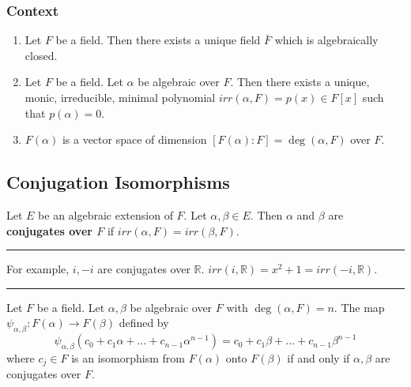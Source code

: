 \subsubsection*{Context}
\begin{enumerate}
	\item Let $F$ be a field.
		Then there exists a unique field $\bar{F}$ which is algebraically closed.
	\item Let $F$ be a field.
		Let $\alpha$ be algebraic over $F$.
		Then there exists a unique, monic, irreducible, minimal polynomial $irr(\alpha,F) = p(x) \in F[x]$ such that $p(\alpha) = 0$.
	\item $F(\alpha)$ is a vector space of dimension $[F(\alpha) : F] = \deg (\alpha,F)$ over $F$.
\end{enumerate}

\subsection{Conjugation Isomorphisms}
\begin{definition}[conjugates]
	Let $E$ be an algebraic extension of $F$.
	Let $\alpha,\beta \in E$.
	Then $\alpha$ and $\beta$ are \textbf{conjugates over $F$} if $irr(\alpha,F) = irr(\beta,F)$.
\end{definition}
\hrule\vspace{1em}
For example, $i,-i$ are conjugates over $\mathbb{R}$.
$irr(i,\mathbb{R}) = x^2+1 = irr(-i,\mathbb{R})$.
\hrule\vspace{1em}
\begin{theorem}
	Let $F$ be a field.
	Let $\alpha,\beta$ be algebraic over $F$ with $\deg(\alpha,F) = n$.
	The map $\psi_{\alpha,\beta} : F(\alpha) \to F(\beta)$ defined by 
	\[ \psi_{\alpha,\beta} \left( c_0 + c_1\alpha + \dots + c_{n-1}\alpha^{n-1} \right) = c_0 + c_1\beta + \dots + c_{n-1}\beta^{n-1} \]
	where $c_j \in F$ is an isomorphism from $F(\alpha)$ onto $F(\beta)$ if and only if $\alpha,\beta$ are conjugates over $F$.
\end{theorem}
